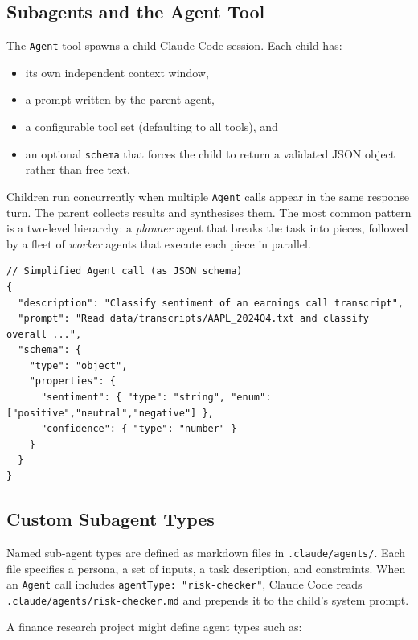 \subsection{Subagents and the Agent Tool}
\label{app:claude-code:subagents}

The \texttt{Agent} tool spawns a child Claude Code session.  Each child has:

\begin{itemize}
  \item its own independent context window,
  \item a prompt written by the parent agent,
  \item a configurable tool set (defaulting to all tools), and
  \item an optional \texttt{schema} that forces the child to return a validated
        JSON object rather than free text.
\end{itemize}

Children run concurrently when multiple \texttt{Agent} calls appear in the same
response turn.  The parent collects results and synthesises them.  The most
common pattern is a two-level hierarchy: a \emph{planner} agent that breaks the
task into pieces, followed by a fleet of \emph{worker} agents that execute each
piece in parallel.

\begin{verbatim}
// Simplified Agent call (as JSON schema)
{
  "description": "Classify sentiment of an earnings call transcript",
  "prompt": "Read data/transcripts/AAPL_2024Q4.txt and classify overall ...",
  "schema": {
    "type": "object",
    "properties": {
      "sentiment": { "type": "string", "enum": ["positive","neutral","negative"] },
      "confidence": { "type": "number" }
    }
  }
}
\end{verbatim}

\subsection{Custom Subagent Types}
\label{app:claude-code:custom-agents}

Named sub-agent types are defined as markdown files in
\texttt{.claude/agents/}.  Each file specifies a persona, a set of inputs, a
task description, and constraints.  When an \texttt{Agent} call includes
\texttt{agentType: "risk-checker"}, Claude Code reads
\texttt{.claude/agents/risk-checker.md} and prepends it to the child's system
prompt.

A finance research project might define agent types such as:

